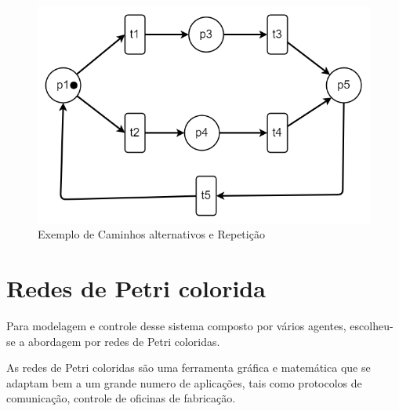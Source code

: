 \begin{figure}[ht]
    \centering
    \includegraphics[scale=0.4]{figures/Petri/caminhos_alternativos.png}
    \caption{Exemplo de Caminhos alternativos e Repetição}
    \label{fig:caminhos_alternativos}
\end{figure}

\section{Redes de Petri colorida}
Para modelagem e controle desse sistema composto por vários agentes, escolheu-se a abordagem por redes de Petri coloridas.

As redes de Petri  coloridas são uma ferramenta gráfica e matemática que se adaptam bem a um grande numero de aplicações, tais como protocolos de comunicação, controle de oficinas de fabricação. 
